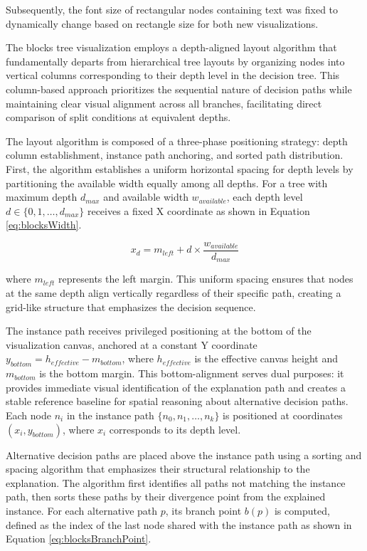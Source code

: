 Subsequently, the font size of rectangular nodes containing text was fixed to dynamically change based on rectangle size \cite{git29commit} for both new visualizations.

The blocks tree visualization employs a depth-aligned layout algorithm that fundamentally departs from hierarchical tree layouts by organizing nodes into vertical columns corresponding to their depth level in the decision tree. This column-based approach prioritizes the sequential nature of decision paths while maintaining clear visual alignment across all branches, facilitating direct comparison of split conditions at equivalent depths.

The layout algorithm is composed of a three-phase positioning strategy: depth column establishment, instance path anchoring, and sorted path distribution. First, the algorithm establishes a uniform horizontal spacing for depth levels by partitioning the available width equally among all depths. For a tree with maximum depth $d_{max}$ and available width $w_{available}$, each depth level $d \in \{0, 1, \ldots, d_{max}\}$ receives a fixed X coordinate as shown in Equation \ref{eq:blocksWidth}.

\begin{equation}
x_d = m_{left} + d \times \frac{w_{available}}{d_{max}}
\label{eq:blocksWidth}
\end{equation}

where $m_{left}$ represents the left margin. This uniform spacing ensures that nodes at the same depth align vertically regardless of their specific path, creating a grid-like structure that emphasizes the decision sequence.

The instance path receives privileged positioning at the bottom of the visualization canvas, anchored at a constant Y coordinate $y_{bottom} = h_{effective} - m_{bottom}$, where $h_{effective}$ is the effective canvas height and $m_{bottom}$ is the bottom margin. This bottom-alignment serves dual purposes: it provides immediate visual identification of the explanation path and creates a stable reference baseline for spatial reasoning about alternative decision paths. Each node $n_i$ in the instance path $\{n_0, n_1, \ldots, n_k\}$ is positioned at coordinates $(x_i, y_{bottom})$, where $x_i$ corresponds to its depth level.

Alternative decision paths are placed above the instance path using a sorting and spacing algorithm that emphasizes their structural relationship to the explanation. The algorithm first identifies all paths not matching the instance path, then sorts these paths by their divergence point from the explained instance. For each alternative path $p$, its branch point $b(p)$ is computed, defined as the index of the last node shared with the instance path as shown in Equation \ref{eq:blocksBranchPoint}.

